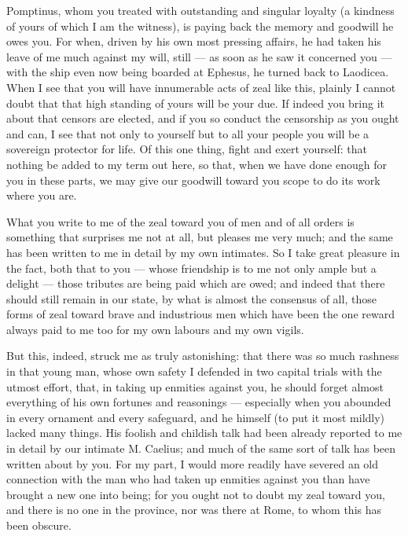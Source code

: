  Pomptinus, whom you treated with outstanding and singular loyalty (a kindness of yours of which I am the witness), is paying back the memory and goodwill he owes you. For when, driven by his own most pressing affairs, he had taken his leave of me much against my will, still --- as soon as he saw it concerned you --- with the ship even now being boarded at Ephesus, he turned back to Laodicea. When I see that you will have innumerable acts of zeal like this, plainly I cannot doubt that that high standing of yours will be your due. If indeed you bring it about that censors are elected, and if you so conduct the censorship as you ought and can, I see that not only to yourself but to all your people you will be a sovereign protector for life. Of this one thing, fight and exert yourself: that nothing be added to my term out here, so that, when we have done enough for you in these parts, we may give our goodwill toward you scope to do its work where you are.

 What you write to me of the zeal toward you of men and of all orders is something that surprises me not at all, but pleases me very much; and the same has been written to me in detail by my own intimates. So I take great pleasure in the fact, both that to you --- whose friendship is to me not only ample but a delight --- those tributes are being paid which are owed; and indeed that there should still remain in our state, by what is almost the consensus of all, those forms of zeal toward brave and industrious men which have been the one reward always paid to me too for my own labours and my own vigils.

 But this, indeed, struck me as truly astonishing: that there was so much rashness in that young man, whose own safety I defended in two capital trials with the utmost effort, that, in taking up enmities against you, he should forget almost everything of his own fortunes and reasonings --- especially when you abounded in every ornament and every safeguard, and he himself (to put it most mildly) lacked many things. His foolish and childish talk had been already reported to me in detail by our intimate M. Caelius; and much of the same sort of talk has been written about by you. For my part, I would more readily have severed an old connection with the man who had taken up enmities against you than have brought a new one into being; for you ought not to doubt my zeal toward you, and there is no one in the province, nor was there at Rome, to whom this has been obscure.


